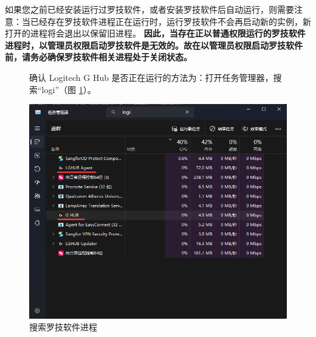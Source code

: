 如果您之前已经安装运行过罗技软件，或者安装罗技软件后自动运行，则需要注意：当已经存在罗技软件进程正在运行时，运行罗技软件不会再启动新的实例，新打开的进程将会退出以保留旧进程。
\textbf{\color{red}因此，当存在正以普通权限运行的罗技软件进程时，以管理员权限启动罗技软件是无效的。故在以管理员权限启动罗技软件前，请务必确保罗技软件相关进程处于关闭状态。}

\begin{figure}[H]
    \Centering
    \parbox[l]{\textwidth}{确认 Logitech G Hub 是否正在运行的方法为：打开任务管理器，搜索“logi”（图 \ref{ch0fig-search-lghub-process}）。}
    \includegraphics[width=\textwidth]{assets/intro/search_lghub_process.png}
    \caption{搜索罗技软件进程}
    \label{ch0fig-search-lghub-process}
\end{figure}

